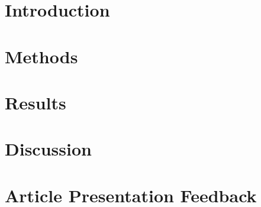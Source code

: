 \documentclass[a4paper]{article}
\begin{document}


\section{Introduction}


\section{Methods}


\section{Results}


\section{Discussion}


\section{Article Presentation Feedback}

\end{document}
